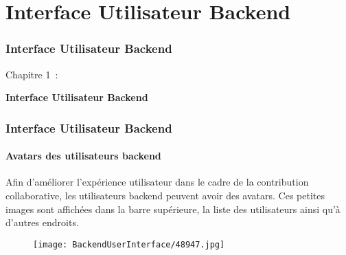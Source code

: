 %

\section{Interface Utilisateur Backend}
\begin{frame}[fragile]
	\frametitle{Interface Utilisateur Backend}

	\begin{center}\huge{Chapitre 1~:}\end{center}
	\begin{center}\huge{\color{typo3darkgrey}\textbf{Interface Utilisateur Backend}}\end{center}

\end{frame}

\begin{frame}[fragile]
	\frametitle{Interface Utilisateur Backend}
	\framesubtitle{Avatars des utilisateurs backend}

	Afin d'améliorer l'expérience utilisateur dans le cadre de la contribution collaborative,
	les utilisateurs backend peuvent avoir des avatars. Ces petites images sont affichées
	dans la barre supérieure, la liste des utilisateurs ainsi qu'à d'autres endroits.

	\begin{figure}
		\texttt{[image: BackendUserInterface/48947.jpg]}
	\end{figure}

\end{frame}

